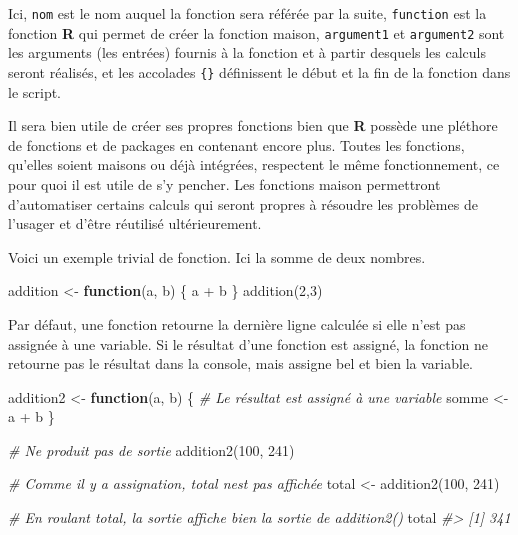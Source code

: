 \documentclass[
]{book}
\newenvironment{Shaded}{}{}
\newcommand{\CommentTok}[1]{\textit{#1}}
\newcommand{\ControlFlowTok}[1]{\textbf{#1}}
\newcommand{\DecValTok}[1]{#1}
\newcommand{\FunctionTok}[1]{#1}
\newcommand{\NormalTok}[1]{#1}
\newcommand{\OtherTok}[1]{#1}
\newcommand{\SpecialCharTok}[1]{#1}
\begin{document}
Ici, \texttt{nom} est le nom auquel la fonction sera référée par la suite, \texttt{function} est la fonction \textbf{R} qui permet de créer la fonction maison, \texttt{argument1} et \texttt{argument2} sont les arguments (les entrées) fournis à la fonction et à partir desquels les calculs seront réalisés, et les accolades \texttt{\{\}} définissent le début et la fin de la fonction dans le script.

Il sera bien utile de créer ses propres fonctions bien que \textbf{R} possède une pléthore de fonctions et de packages en contenant encore plus. Toutes les fonctions, qu'elles soient maisons ou déjà intégrées, respectent le même fonctionnement, ce pour quoi il est utile de s'y pencher. Les fonctions maison permettront d'automatiser certains calculs qui seront propres à résoudre les problèmes de l'usager et d'être réutilisé ultérieurement.

Voici un exemple trivial de fonction. Ici la somme de deux nombres.

\begin{Shaded}
\begin{Highlighting}[]
\NormalTok{addition }\OtherTok{\textless{}{-}} \ControlFlowTok{function}\NormalTok{(a, b) \{}
\NormalTok{  a }\SpecialCharTok{+}\NormalTok{ b}
\NormalTok{\}}
\FunctionTok{addition}\NormalTok{(}\DecValTok{2}\NormalTok{,}\DecValTok{3}\NormalTok{)}
\end{Highlighting}
\end{Shaded}

Par défaut, une fonction retourne la dernière ligne calculée si elle n'est pas assignée à une variable. Si le résultat d'une fonction est assigné, la fonction ne retourne pas le résultat dans la console, mais assigne bel et bien la variable.

\begin{Shaded}
\begin{Highlighting}[]
\NormalTok{addition2 }\OtherTok{\textless{}{-}} \ControlFlowTok{function}\NormalTok{(a, b) \{}
  \CommentTok{\# Le résultat est assigné à une variable}
\NormalTok{  somme }\OtherTok{\textless{}{-}}\NormalTok{ a }\SpecialCharTok{+}\NormalTok{ b}
\NormalTok{\}}

\CommentTok{\# Ne produit pas de sortie}
\FunctionTok{addition2}\NormalTok{(}\DecValTok{100}\NormalTok{, }\DecValTok{241}\NormalTok{)}

\CommentTok{\# Comme il y a assignation, total n\textquotesingle{}est pas affichée}
\NormalTok{total }\OtherTok{\textless{}{-}} \FunctionTok{addition2}\NormalTok{(}\DecValTok{100}\NormalTok{, }\DecValTok{241}\NormalTok{)}

\CommentTok{\# En roulant total, la sortie affiche bien la sortie de addition2()}
\NormalTok{total}
\CommentTok{\#\textgreater{} [1] 341}
\end{Highlighting}
\end{Shaded}
\end{document}
